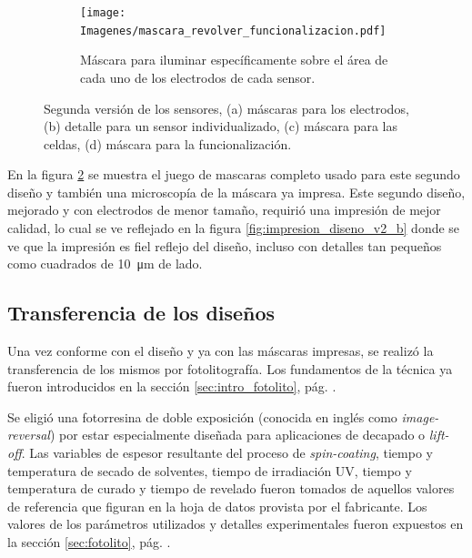 {\begin{figure}[th!]
\begin{subfigure}[t]{0.495\textwidth}
			     		\texttt{[image: Imagenes/mascara\_revolver\_funcionalizacion.pdf]}
			        	\caption{Máscara para iluminar específicamente sobre el área de cada uno de los electrodos de cada sensor.}
			         	\label{fig:mascara_funcionalizacion}
			     		\end{subfigure}
			     		\vspace*{-0.3cm}
			     		\caption[Juego de máscara. Segunda versión]{Segunda versión de los sensores, (a) máscaras  para los electrodos, (b) detalle para un sensor individualizado, (c) máscara para las celdas, (d) máscara para la funcionalización.}
			     		\label{fig:impresion_diseno_V2}
			     	   	\end{figure}
	
		     En la figura \ref{fig:impresion_diseno_V2} se muestra el juego de mascaras completo usado para este segundo diseño y también una microscopía de la máscara ya impresa. Este segundo diseño, mejorado y con electrodos de menor tamaño, requirió una impresión de mejor calidad, lo cual se ve reflejado en la figura \ref{fig:impresion_diseno_v2_b} donde se ve que la impresión es fiel reflejo del diseño, incluso con detalles tan pequeños como cuadrados de \SI{10}{\um} de lado. 
				
 		\subsection{Transferencia de los diseños}

 			 Una vez conforme con el diseño y ya con las máscaras impresas, se realizó la transferencia de los mismos por fotolitografía. Los fundamentos de la técnica ya fueron introducidos en la sección \ref{sec:intro_fotolito}, pág. \pageref{sec:intro_fotolito}.

 			 Se eligió una fotorresina de doble exposición (conocida en inglés como \textit{image-reversal}) por estar especialmente diseñada para aplicaciones de decapado o \textit{lift-off}. Las variables de espesor resultante del proceso de \textit{spin-coating}, tiempo y temperatura de secado de solventes, tiempo de irradiación UV, tiempo y temperatura de curado y tiempo de revelado fueron tomados de aquellos valores de referencia que figuran en la hoja de datos provista por el fabricante. \cite{TI35E} Los valores de los parámetros utilizados y detalles experimentales fueron expuestos en la sección \ref{sec:fotolito}, pág. \pageref{sec:fotolito}.

}
